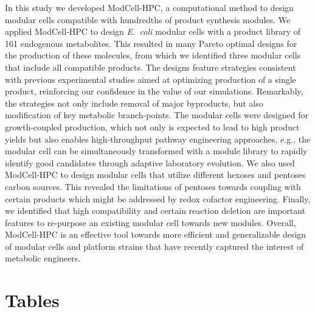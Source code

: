 \documentclass[12pt]{article}
\begin{document}
{In this study we developed ModCell-HPC, a computational method to design modular cells compatible with hundredths of product synthesis modules.
We applied ModCell-HPC to design \textit{E.~coli} modular cells with a product library of 161 endogenous metabolites.
This resulted in many Pareto optimal designs for the production of these molecules, from which we identified three modular cells that include all compatible products.
The designs feature strategies consistent with previous experimental studies aimed at optimizing production of a single product, reinforcing our confidence in the value of our simulations.
Remarkably, the strategies not only include removal of major byproducts, but also modification of key metabolic branch-points.
The modular cells were designed for growth-coupled production,
which not only is expected to lead to high product yields but also enables high-throughput pathway engineering approaches, e.g., the modular cell can be simultaneously transformed with a module library to rapidly identify good candidates through adaptive laboratory evolution.\citep{dragosits2013}
We also used ModCell-HPC to design modular cells that utilize different hexoses and pentoses carbon sources.
This revealed the limitations of pentoses towards coupling with certain products which might be addressed by redox cofactor engineering.
Finally, we identified that high compatibility and certain reaction deletion are important features to re-purpose an existing modular cell towards new modules.
Overall, ModCell-HPC is an effective tool towards more efficient and generalizable design of modular cells and platform strains that have recently captured the interest of metabolic engineers. \citep{nielsen2016}



\section*{Tables}

}
\end{document}
